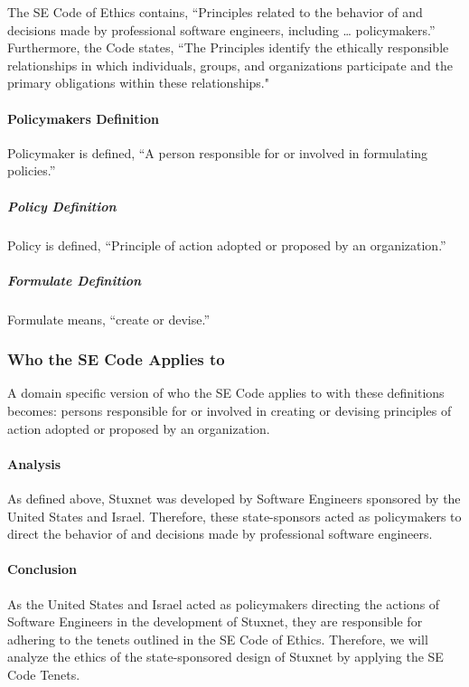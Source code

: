 \documentclass[12pt]{article}
\begin{document}
\begin{multicols}{2}
The SE Code of Ethics contains, “Principles related to the behavior of and decisions made by professional software engineers, including … policymakers.” Furthermore, the Code states, “The Principles identify the ethically responsible relationships in which individuals, groups, and organizations participate and the primary obligations within these relationships."\cite{softwareEngineeringCodeOfEthics}

\paragraph{Policymakers Definition}

Policymaker is defined, “A person responsible for or involved in formulating policies.”\cite{oxfordDictionary}

\subparagraph{Policy Definition}

Policy is defined, “Principle of action adopted or proposed by an organization.”\cite{oxfordDictionary}

\subparagraph{Formulate Definition}

Formulate means, “create or devise.”\cite{oxfordDictionary}

\subsubsection{Who the SE Code Applies to}

A domain specific version of who the SE Code applies to with these definitions becomes: persons responsible for or involved in creating or devising principles of action adopted or proposed by an organization.

\paragraph{Analysis}

As defined above, Stuxnet was developed by Software Engineers sponsored by the United States and Israel. Therefore, these state-sponsors acted as policymakers to direct the behavior of and decisions made by professional software engineers.

\paragraph{Conclusion}

As the United States and Israel acted as policymakers directing the actions of Software Engineers in the development of Stuxnet, they are responsible for adhering to the tenets outlined in the SE Code of Ethics. Therefore, we will analyze the ethics of the state-sponsored design of Stuxnet by applying the SE Code Tenets.


\end{multicols}
\end{document}
